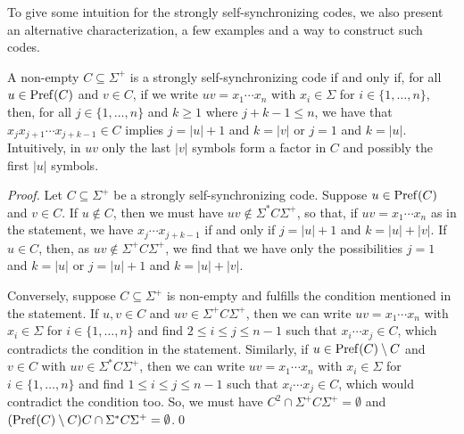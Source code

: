 To give some intuition for the strongly self-synchronizing
codes, we also present an alternative characterization, a few examples and a way to construct such codes.

\begin{propositionrep}
A non-empty $C \subseteq \Sigma^+$
is a strongly self-synchronizing code
if and only if, for
all $u \in \operatorname{Pref}(C)$ and $v \in C$, 
if we write $uv = x_1 \cdots x_n$
with $x_i \in \Sigma$ for $i \in \{1,\ldots, n\}$,
then, for all $j \in \{1,\ldots,n\}$ and $k \ge 1$ where $j + k - 1 \le n$,
we have that $x_j x_{j + 1} \cdots x_{j+k-1} \in C$
implies $j = |u| + 1$ and $k = |v|$
or $j = 1$ and $k = |u|$.
Intuitively, in $uv$ only the last $|v|$ symbols form a factor in $C$
and possibly the first $|u|$ symbols.
\end{propositionrep}
\begin{proof}
 Let $C \subseteq \Sigma^+$ be a strongly self-synchronizing code.
 Suppose $u \in \operatorname{Pref}(C)$ and $v \in C$.
 If $u \notin C$, then we must have $uv \notin \Sigma^*C\Sigma^+$,
 so that, if $uv = x_1 \cdots x_n$ as in the statement,
 we have $x_j \cdots x_{j+k-1}$ if and only if $j = |u| + 1$
 and $k = |u| + |v|$.
 If $u \in C$, then, as $uv \notin \Sigma^+ C \Sigma^+$,
 we find that we have only the possibilities
 $j = 1$ and $k = |u|$ or $j = |u| + 1$ and $k = |u| + |v|$.
 
 Conversely, suppose $C \subseteq \Sigma^+$ is non-empty
 and fulfills the condition mentioned in the statement.
 If $u, v \in C$ and $uv \in \Sigma^+ C \Sigma^+$,
 then we can write $uv = x_1 \cdots x_n$ with $x_i \in \Sigma$ for $i \in \{1,\ldots,n\}$
 and find $2 \le i \le j \le n - 1$
 such that $x_i \cdots x_j \in C$, which contradicts
 the condition in the statement.
 Similarly, if $u \in \operatorname{Pref}(C) \setminus C$
 and $v \in C$ with $uv \in \Sigma^*C\Sigma^+$,
 then we can write $uv = x_1 \cdots x_n$ with $x_i \in \Sigma$ for $i \in \{1,\ldots,n\}$
 and find $1 \le i \le j \le n - 1$
 such that $x_i \cdots x_j \in C$, which would contradict
 the condition too. So, we must
 have $C^2 \cap \Sigma^+ C \Sigma^+ = \emptyset$
 and $(\operatorname{Pref}(C) \setminus C) C \cap \Sigma^* C \Sigma^+ = \emptyset$.\qed 
\end{proof}


